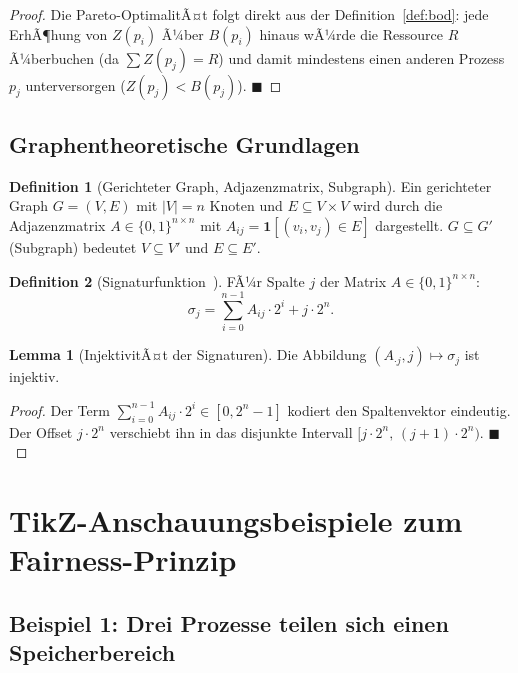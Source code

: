﻿\documentclass[a4paper,12pt]{article}
\theoremstyle{definition}
\newtheorem{definition}{Definition}
\newtheorem{lemma}{Lemma}
\begin{document}
\begin{proof}
Die Pareto-OptimalitÃ¤t folgt direkt aus der Definition~\ref{def:bod}:
jede ErhÃ¶hung von $Z(p_i)$ Ã¼ber $B(p_i)$ hinaus wÃ¼rde die Ressource
$R$ Ã¼berbuchen (da $\sum Z(p_j) = R$) und damit mindestens einen
anderen Prozess $p_j$ unterversorgen ($Z(p_j) < B(p_j)$).
\hfill$\blacksquare$
\end{proof}

\subsection{Graphentheoretische Grundlagen}

\begin{definition}[Gerichteter Graph, Adjazenzmatrix, Subgraph]
Ein gerichteter Graph $G = (V, E)$ mit $|V| = n$ Knoten und
$E \subseteq V \times V$ wird durch die Adjazenzmatrix
$A \in \{0,1\}^{n\times n}$ mit $A_{ij} = \mathbf{1}[(v_i, v_j) \in E]$
dargestellt. $G \subseteq G'$ (Subgraph) bedeutet $V \subseteq V'$ und
$E \subseteq E'$.
\end{definition}

\begin{definition}[Signaturfunktion~\cite{epp2026subgraph}]
\label{def:sig}
FÃ¼r Spalte $j$ der Matrix $A \in \{0,1\}^{n\times n}$:
\[
  \sigma_j = \sum_{i=0}^{n-1} A_{ij} \cdot 2^i + j \cdot 2^n.
\]
\end{definition}

\begin{lemma}[InjektivitÃ¤t der Signaturen]
Die Abbildung $(A_{\cdot j}, j) \mapsto \sigma_j$ ist injektiv.
\end{lemma}

\begin{proof}
Der Term $\sum_{i=0}^{n-1} A_{ij} \cdot 2^i \in [0, 2^n - 1]$ kodiert
den Spaltenvektor eindeutig. Der Offset $j \cdot 2^n$ verschiebt ihn
in das disjunkte Intervall $[j \cdot 2^n,\, (j+1) \cdot 2^n)$.
\hfill$\blacksquare$
\end{proof}

\section{TikZ-Anschauungsbeispiele zum Fairness-Prinzip}
\label{sec:tikz}

\subsection{Beispiel 1: Drei Prozesse teilen sich einen Speicherbereich}
\end{document}
